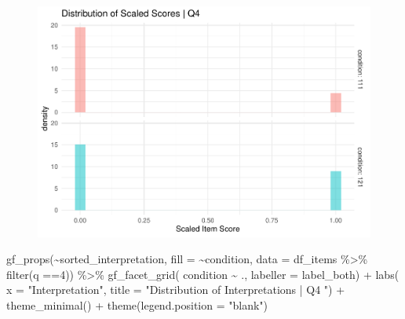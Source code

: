 \documentclass[
  letterpaper,
  DIV=11,
  numbers=noendperiod]{scrreprt}
\newenvironment{Shaded}{\begin{snugshade}}{\end{snugshade}}
\newcommand{\AttributeTok}[1]{\textcolor[rgb]{0.40,0.45,0.13}{#1}}
\newcommand{\DecValTok}[1]{\textcolor[rgb]{0.68,0.00,0.00}{#1}}
\newcommand{\FunctionTok}[1]{\textcolor[rgb]{0.28,0.35,0.67}{#1}}
\newcommand{\NormalTok}[1]{\textcolor[rgb]{0.00,0.23,0.31}{#1}}
\newcommand{\SpecialCharTok}[1]{\textcolor[rgb]{0.37,0.37,0.37}{#1}}
\newcommand{\StringTok}[1]{\textcolor[rgb]{0.13,0.47,0.30}{#1}}
\begin{document}
\begin{figure}[H]

{\centering \includegraphics{analysis/SGC3A/2_sgc3A_scoring_files/figure-pdf/Q4-distribution-1.pdf}

}

\end{figure}

\begin{Shaded}
\begin{Highlighting}[]
\FunctionTok{gf\_props}\NormalTok{(}\SpecialCharTok{\textasciitilde{}}\NormalTok{sorted\_interpretation, }\AttributeTok{fill =} \SpecialCharTok{\textasciitilde{}}\NormalTok{condition, }\AttributeTok{data =}\NormalTok{ df\_items }\SpecialCharTok{\%\textgreater{}\%} \FunctionTok{filter}\NormalTok{(q }\SpecialCharTok{==}\DecValTok{4}\NormalTok{)) }\SpecialCharTok{\%\textgreater{}\%} 
  \FunctionTok{gf\_facet\_grid}\NormalTok{( condition }\SpecialCharTok{\textasciitilde{}}\NormalTok{ ., }\AttributeTok{labeller =}\NormalTok{ label\_both) }\SpecialCharTok{+} 
  \FunctionTok{labs}\NormalTok{( }\AttributeTok{x =} \StringTok{"Interpretation"}\NormalTok{, }\AttributeTok{title =} \StringTok{"Distribution of Interpretations | Q4 "}\NormalTok{) }\SpecialCharTok{+} 
  \FunctionTok{theme\_minimal}\NormalTok{() }\SpecialCharTok{+} \FunctionTok{theme}\NormalTok{(}\AttributeTok{legend.position =} \StringTok{"blank"}\NormalTok{)}
\end{Highlighting}
\end{Shaded}
\end{document}
